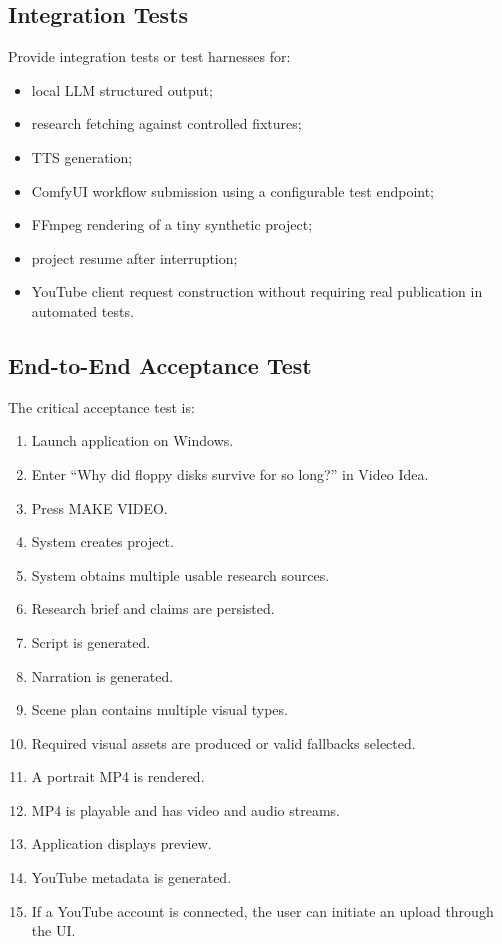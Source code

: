 \documentclass[10pt,journal,compsoc]{IEEEtran}
\begin{document}
\subsection{Integration Tests}

Provide integration tests or test harnesses for:
\begin{itemize}
    \item local LLM structured output;
    \item research fetching against controlled fixtures;
    \item TTS generation;
    \item ComfyUI workflow submission using a configurable test endpoint;
    \item FFmpeg rendering of a tiny synthetic project;
    \item project resume after interruption;
    \item YouTube client request construction without requiring real publication in automated tests.
\end{itemize}

\subsection{End-to-End Acceptance Test}

The critical acceptance test is:

\begin{enumerate}
    \item Launch application on Windows.
    \item Enter ``Why did floppy disks survive for so long?'' in Video Idea.
    \item Press MAKE VIDEO.
    \item System creates project.
    \item System obtains multiple usable research sources.
    \item Research brief and claims are persisted.
    \item Script is generated.
    \item Narration is generated.
    \item Scene plan contains multiple visual types.
    \item Required visual assets are produced or valid fallbacks selected.
    \item A portrait MP4 is rendered.
    \item MP4 is playable and has video and audio streams.
    \item Application displays preview.
    \item YouTube metadata is generated.
    \item If a YouTube account is connected, the user can initiate an upload through the UI.
\end{enumerate}
\end{document}
